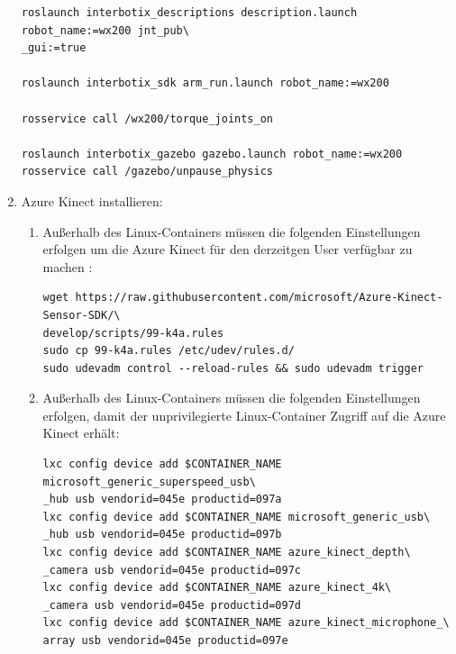 \begin{enumerate}[label*=\arabic*.]
        \begin{lstlisting}[style=bash]
roslaunch interbotix_descriptions description.launch robot_name:=wx200 jnt_pub\
_gui:=true

roslaunch interbotix_sdk arm_run.launch robot_name:=wx200

rosservice call /wx200/torque_joints_on

roslaunch interbotix_gazebo gazebo.launch robot_name:=wx200
rosservice call /gazebo/unpause_physics
        \end{lstlisting}


    \item Azure Kinect installieren:
        \begin{enumerate}[label*=\arabic*.]
            \item Außerhalb des Linux-Containers müssen die folgenden Einstellungen erfolgen um die Azure Kinect für den derzeitgen User verfügbar zu machen \cite{microsoftazure-kinect-sensor-sdk_installation_nodate}:

                \begin{lstlisting}[style=bash]
wget https://raw.githubusercontent.com/microsoft/Azure-Kinect-Sensor-SDK/\
develop/scripts/99-k4a.rules
sudo cp 99-k4a.rules /etc/udev/rules.d/
sudo udevadm control --reload-rules && sudo udevadm trigger
                \end{lstlisting}

            \item Außerhalb des Linux-Containers müssen die folgenden Einstellungen erfolgen, damit der unprivilegierte Linux-Container Zugriff auf die Azure Kinect erhält:
                \begin{lstlisting}[style=bash]
lxc config device add $CONTAINER_NAME microsoft_generic_superspeed_usb\
_hub usb vendorid=045e productid=097a
lxc config device add $CONTAINER_NAME microsoft_generic_usb\
_hub usb vendorid=045e productid=097b
lxc config device add $CONTAINER_NAME azure_kinect_depth\
_camera usb vendorid=045e productid=097c
lxc config device add $CONTAINER_NAME azure_kinect_4k\
_camera usb vendorid=045e productid=097d
lxc config device add $CONTAINER_NAME azure_kinect_microphone_\
array usb vendorid=045e productid=097e
                \end{lstlisting}


\end{enumerate}
\end{enumerate}
